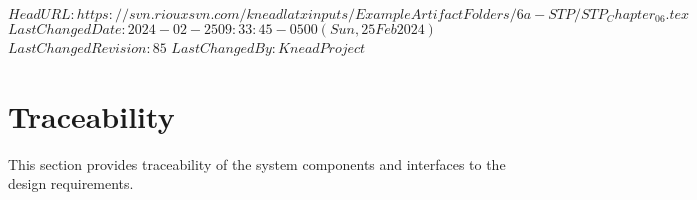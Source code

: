 \svnidlong
{$HeadURL: https://svn.riouxsvn.com/kneadlatxinputs/ExampleArtifactFolders/6a-STP/STP_Chapter_06.tex $}
{$LastChangedDate: 2024-02-25 09:33:45 -0500 (Sun, 25 Feb 2024) $}
{$LastChangedRevision: 85 $}
{$LastChangedBy: KneadProject $}

\chapter{Traceability}
\label{loc:Traceability}


This section provides traceability of the system components and interfaces to the design requirements.


